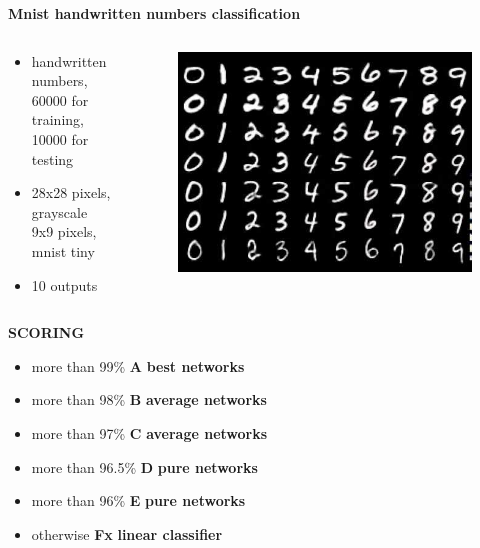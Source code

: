 \documentclass[xcolor=dvipsnames]{beamer}
\begin{document}
\begin{frame}{\bf Mnist handwritten numbers classification}

\begin{columns}


    \begin{column}{0.5\textwidth}

        \begin{itemize}
            \item handwritten numbers, \\
                60000 for training, \\
                10000 for testing
            \item 28x28 pixels, grayscale \\
                  9x9 pixels, mnist tiny
            \item 10 outputs
        \end{itemize}

    \end{column}

    \begin{column}{0.5\textwidth}

    \begin{figure}
      \includegraphics[scale=0.23]{../../pictures/mnist.jpg}
    \end{figure}

    \end{column}


\end{columns}


{\bf SCORING}
\begin{itemize}
\item more than 99\%  {\bf A} {\bf \color{green} best networks}
\item more than 98\%  {\bf B}  {\bf \color{blue} average networks}
\item more than 97\%  {\bf C}  {\bf \color{blue} average networks}
\item more than 96.5\%  {\bf D}   {\bf \color{red} pure networks}
\item more than 96\%  {\bf E}  {\bf \color{red} pure networks}
\item otherwise  {\bf Fx} {\bf \color{gray} linear classifier}


\end{itemize}
\end{frame}
\end{document}
